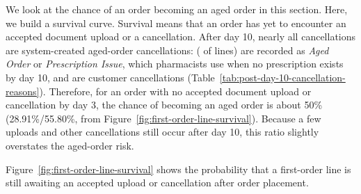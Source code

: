 \label{subsec:survival-analysis}


We look at the chance of an order becoming an aged order in this
section. Here, we build a survival curve. Survival means that an order
has yet to encounter an accepted document upload or a cancellation.
After day 10, nearly all cancellations are system-created aged-order
cancellations: \PostDayTenAgingShare{} (\PostDayTenAgingLines{} of
\PostDayTenTotalLines{} lines) are recorded as \emph{Aged Order} or
\emph{Prescription Issue}, which pharmacists use when no prescription
exists by day 10, and \PostDayTenCustomerShare{} are customer
cancellations (Table~\ref{tab:post-day-10-cancellation-reasons}).
Therefore, for an order with no accepted document upload or
cancellation by day 3, the chance of becoming an aged order is about
50\% (28.91\%/55.80\%, from Figure~\ref{fig:first-order-line-survival}).
Because a few uploads and other cancellations still occur after day 10,
this ratio slightly overstates the aged-order risk.

Figure~\ref{fig:first-order-line-survival} shows the probability that a first-order
line is still awaiting an accepted upload or cancellation after order placement.

